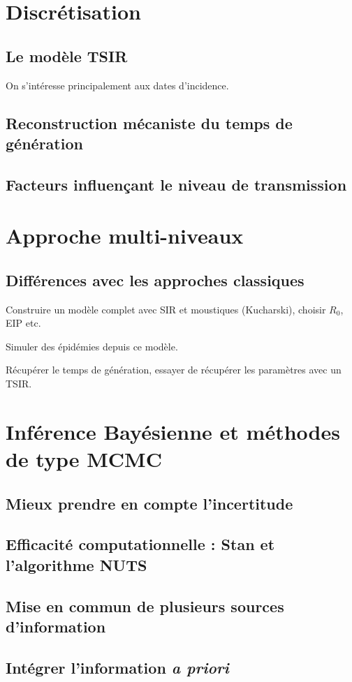 \section{Discrétisation}

\subsection{Le modèle TSIR}

On s'intéresse principalement aux dates d'incidence.

\subsection{Reconstruction mécaniste du temps de génération}

\subsection{Facteurs influençant le niveau de transmission}

\section{Approche multi-niveaux}

\subsection{Différences avec les approches classiques}

Construire un modèle complet avec SIR et moustiques (Kucharski), choisir $R_0$, EIP etc.

Simuler des épidémies depuis ce modèle.

Récupérer le temps de génération, essayer de récupérer les paramètres avec un TSIR.

\section{Inférence Bayésienne et méthodes de type MCMC}
\label{sec:infbay}

\subsection{Mieux prendre en compte l'incertitude}

\subsection{Efficacité computationnelle : Stan et l'algorithme NUTS}

\subsection{Mise en commun de plusieurs sources d'information}

\subsection{Intégrer l'information {\em a priori}}



